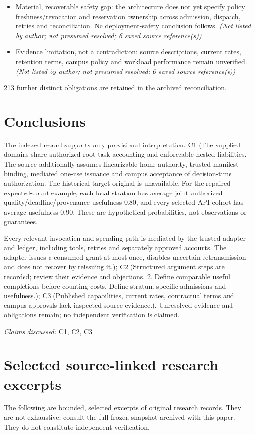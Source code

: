 \documentclass[11pt]{article}
\begin{document}
\begin{itemize}
\item Material, recoverable safety gap: the architecture does not yet specify policy freshness/revocation and reservation ownership across admission, dispatch, retries and reconciliation. No deployment-safety conclusion follows. \textit{ (Not listed by author; not presumed resolved; 6 saved source reference(s))}
\item Evidence limitation, not a contradiction: source descriptions, current rates, retention terms, campus policy and workload performance remain unverified. \textit{ (Not listed by author; not presumed resolved; 6 saved source reference(s))}
\end{itemize}
213 further distinct obligations are retained in the archived reconciliation.
\section{Conclusions}
The indexed record supports only provisional interpretation: C1 (The supplied domains share authorized root-task accounting and enforceable nested liabilities. The source additionally assumes linearizable home authority, trusted manifest binding, mediated one-use issuance and campus acceptance of decision-time authorization. The historical target original is unavailable. For the repaired expected-count example, each local stratum has average joint authorized quality/deadline/provenance usefulness 0.80, and every selected API cohort has average usefulness 0.90. These are hypothetical probabilities, not observations or guarantees.

Every relevant invocation and spending path is mediated by the trusted adapter and ledger, including tools, retries and separately approved accounts. The adapter issues a consumed grant at most once, disables uncertain retransmission and does not recover by reissuing it.); C2 (Structured argument steps are recorded; review their evidence and objections. 2. Define comparable useful completions before counting costs. Define stratum-specific admissions and usefulness.); C3 (Published capabilities, current rates, contractual terms and campus approvals lack inspected source evidence.). Unresolved evidence and obligations remain; no independent verification is claimed.

\textit{Claims discussed: }C1, C2, C3
\appendix
\section{Selected source-linked research excerpts}
The following are bounded, selected excerpts of original research records. They are not exhaustive; consult the full frozen snapshot archived with this paper. They do not constitute independent verification.
\end{document}

